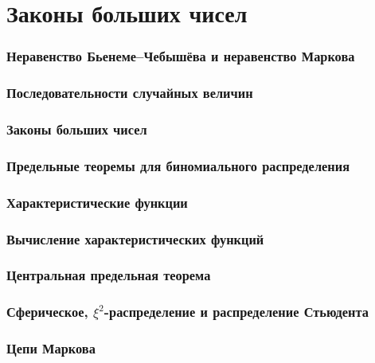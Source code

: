 \part{Законы больших чисел}

\section{Неравенство Бьенеме–Чебышёва и
неравенство Маркова}

\section{Последовательности случайных величин}

\section{Законы больших чисел}

\section{Предельные теоремы для
биномиального распределения}

\section{Характеристические функции}

\section{Вычисление характеристических
функций}

\section{Центральная предельная теорема}

\section{Сферическое, $\xi^2$-распределение
и распределение Стьюдента}

\section{Цепи Маркова}









